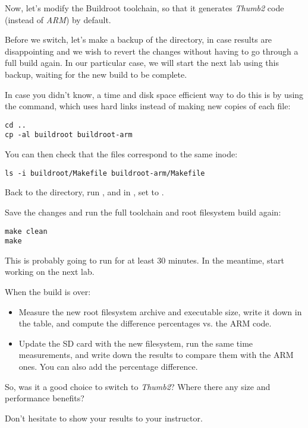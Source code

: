 Now, let's modify the Buildroot toolchain, so that it generates {\em
Thumb2} code (instead of {\em ARM}) by default.

Before we switch, let's make a backup of the  directory,
in case results are disappointing and we wish to revert the changes without
having to go through a full build again. In our particular case, we will
start the next lab using this backup, waiting for the new build to be
complete.

In case you didn't know, a time and disk space efficient way to do this is by using the
 command, which uses hard links instead of making new copies
of each file:

\begin{verbatim}
cd ..
cp -al buildroot buildroot-arm
\end{verbatim}

You can then check that the files correspond to the same inode:
\begin{verbatim}
ls -i buildroot/Makefile buildroot-arm/Makefile
\end{verbatim}

Back to the  directory, run , and
in , set  to
.

Save the changes and run the full toolchain and root filesystem build
again:

\begin{verbatim}
make clean
make
\end{verbatim}

This is probably going to run for at least 30 minutes. In the meantime,
start working on the next lab.

When the build is over:
\begin{itemize}
\item Measure the new root filesystem archive and 
executable size, write it down in the table, and compute the difference
percentages vs. the ARM code.
\item Update the SD card with the new filesystem, run the same time
measurements, and write down the results to compare them with the ARM
ones. You can also add the percentage difference.
\end{itemize}

So, was it a good choice to switch to {\em Thumb2}? Where there any size
and performance benefits?

Don't hesitate to show your results to your instructor.


